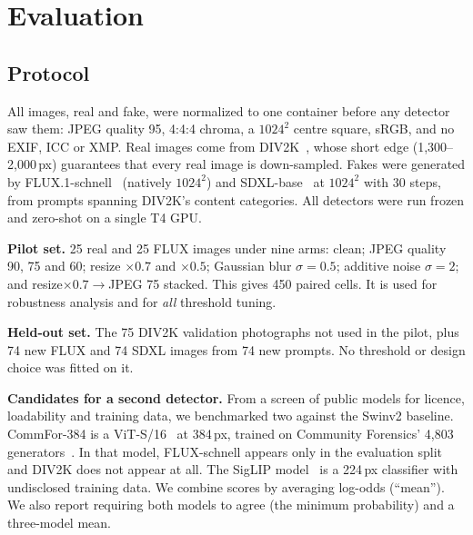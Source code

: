 \documentclass[conference]{IEEEtran}
\begin{document}
\section{Evaluation}
\label{sec:eval}

\subsection{Protocol}
All images, real and fake, were normalized to one container before any
detector saw them: JPEG quality 95, 4:4:4 chroma, a $1024^2$ centre square,
sRGB, and no EXIF, ICC or XMP. Real images come from DIV2K~\cite{agustsson2017div2k},
whose short edge (1,300--2,000\,px) guarantees that every real image is
down-sampled. Fakes were generated by FLUX.1-schnell~\cite{blackforestlabs2024flux}
(natively $1024^2$) and SDXL-base~\cite{podell2024sdxl} at $1024^2$ with 30
steps, from prompts spanning DIV2K's content categories. All detectors
were run frozen and zero-shot on a single T4 GPU.

\textbf{Pilot set.} 25 real and 25 FLUX images under nine arms: clean;
JPEG quality 90, 75 and 60; resize $\times0.7$ and $\times0.5$; Gaussian blur
$\sigma = 0.5$; additive noise $\sigma = 2$; and resize$\times0.7\to$JPEG 75
stacked. This gives 450 paired cells. It is used for robustness analysis and
for \emph{all} threshold tuning.

\textbf{Held-out set.} The 75 DIV2K validation photographs not used in the
pilot, plus 74 new FLUX and 74 SDXL images from 74 new prompts. No threshold
or design choice was fitted on it.

\textbf{Candidates for a second detector.} From a screen of public models
for licence, loadability and training data, we benchmarked two against
the Swinv2 baseline. CommFor-384 is a ViT-S/16~\cite{dosovitskiy2021vit} at
384\,px, trained on Community Forensics' 4,803 generators~\cite{park2025commfor,owenslab2025commfor384}.
In that model, FLUX-schnell appears only in the evaluation split and DIV2K
does not appear at all. The SigLIP model~\cite{zhai2023siglip,ateeqq2025aivshuman}
is a 224\,px classifier with undisclosed training data. We combine scores
by averaging log-odds (``mean''). We also report requiring both models to
agree (the minimum probability) and a three-model mean.
\end{document}
